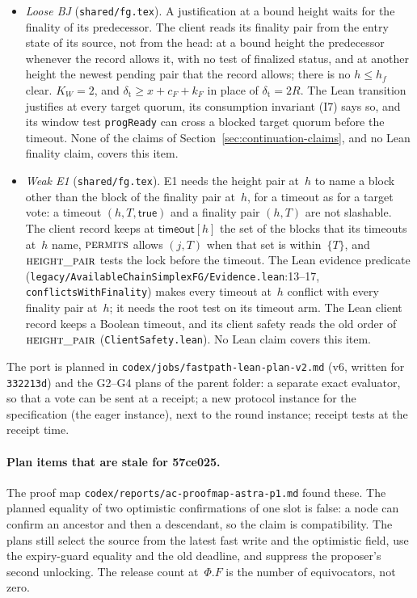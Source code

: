 \documentclass{article}
\newcommand{\Fr}{\Phi}
\begin{document}
\begin{itemize}
  record and the head.
\item[(P8)] \emph{Loose BJ} (\texttt{shared/fg.tex}).  A justification at
  a bound height waits for the finality of its predecessor.  The client
  reads its finality pair from the entry state of its source, not from the
  head: at a bound height the predecessor whenever the record allows it,
  with no test of finalized status, and at another height the newest
  pending pair that the record allows; there is no $h\leq h_f$ clear.
  $K_W=2$, and $\delta_{\mathrm t}\geq x+c_F+k_F$ in place of
  $\delta_{\mathrm t}=2R$.  The Lean transition justifies at every target
  quorum, its consumption invariant (I7) says so, and its window test
  \texttt{progReady} can cross a blocked target quorum before the timeout.
  None of the claims of Section~\ref{sec:continuation-claims}, and no Lean
  finality claim, covers this item.
\item[(P9)] \emph{Weak E1} (\texttt{shared/fg.tex}).  E1 needs the height
  pair at~$h$ to name a block other than the block of the finality pair
  at~$h$, for a timeout as for a target vote: a timeout $(h,T,\mathsf{true})$
  and a finality pair $(h,T)$ are not slashable.  The client record keeps
  at $\mathsf{timeout}[h]$ the set of the blocks that its timeouts at~$h$
  name, $\Call{permits}{}$ allows $(j,T)$ when that set is within~$\{T\}$,
  and $\Call{height\_pair}{}$ tests the lock before the timeout.  The Lean
  evidence predicate (\nolinkurl{legacy/AvailableChainSimplexFG/Evidence.lean}:13--17,
  \texttt{conflictsWithFinality}) makes every timeout at~$h$ conflict
  with every finality pair at~$h$; it needs the root test on its timeout
  arm.  The Lean client record keeps a Boolean timeout, and its client
  safety reads the old order of $\Call{height\_pair}{}$
  (\texttt{ClientSafety.lean}).  No Lean claim covers this item.
\end{itemize}
The port is planned in \nolinkurl{codex/jobs/fastpath-lean-plan-v2.md}
(v6, written for \texttt{332213d}) and the G2--G4 plans of the parent
folder: a separate exact evaluator, so that a vote can be sent at a
receipt; a new protocol instance for the specification (the eager
instance), next to the round instance; receipt tests at the receipt time.

\paragraph{Plan items that are stale for 57ce025.}
The proof map \nolinkurl{codex/reports/ac-proofmap-astra-p1.md} found
these.  The planned equality of two optimistic confirmations of one slot
is false: a node can confirm an ancestor and then a descendant, so the
claim is compatibility.  The plans still select the source from the latest
fast write and the optimistic field, use the expiry-guard equality and the
old deadline, and suppress the proposer's second unlocking.  The release
count at~$\Fr.F$ is the number of equivocators, not zero.
\end{document}
